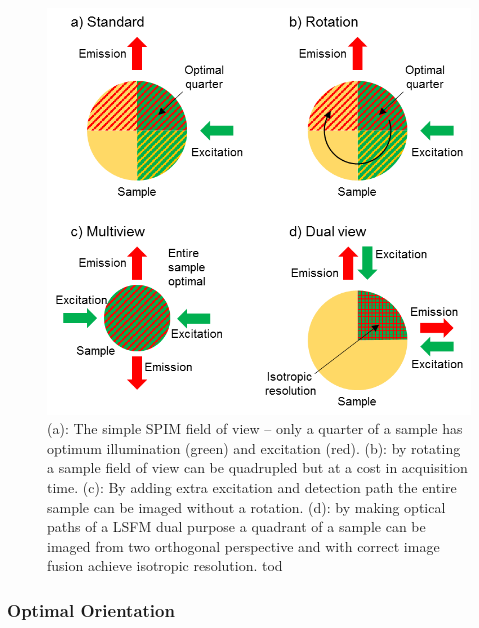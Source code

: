 \begin{figure}
	\centering
	\includegraphics[width=\columnwidth]{spim_optimal_imaging.png}
	\caption{
	(a): The simple SPIM field of view – only a quarter of a sample has optimum illumination (green) and excitation (red).
	(b): by rotating a sample field of view can be quadrupled but at a cost in acquisition time.
	(c): By adding extra excitation and detection path the entire sample can be imaged without a rotation.
	(d): by making optical paths of a LSFM dual purpose a quadrant of a sample can be imaged from two orthogonal perspective and with correct image fusion achieve isotropic resolution.
	tod}
	\label{spim_optimal_imaging}
\end{figure}

\subsubsection{Optimal Orientation}

